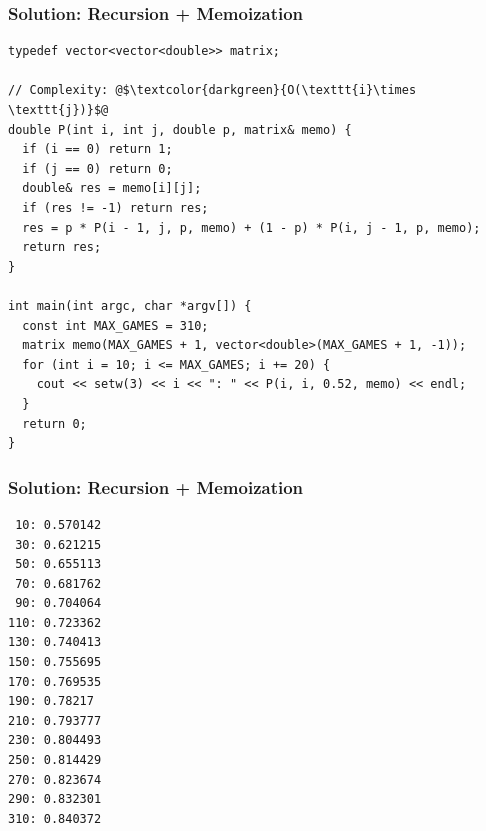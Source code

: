 \documentclass{beamer}
\begin{document}

\begin{frame}[containsverbatim]
\frametitle{Solution: Recursion + Memoization}

\scriptsize
\begin{lstlisting}
typedef vector<vector<double>> matrix;

// Complexity: @$\textcolor{darkgreen}{O(\texttt{i}\times \texttt{j})}$@
double P(int i, int j, double p, matrix& memo) {
  if (i == 0) return 1;
  if (j == 0) return 0;
  double& res = memo[i][j];
  if (res != -1) return res;
  res = p * P(i - 1, j, p, memo) + (1 - p) * P(i, j - 1, p, memo);
  return res;
}

int main(int argc, char *argv[]) {
  const int MAX_GAMES = 310;
  matrix memo(MAX_GAMES + 1, vector<double>(MAX_GAMES + 1, -1));
  for (int i = 10; i <= MAX_GAMES; i += 20) {
    cout << setw(3) << i << ": " << P(i, i, 0.52, memo) << endl;
  }
  return 0;
}
\end{lstlisting}

\end{frame}

\begin{frame}[containsverbatim]
\frametitle{Solution: Recursion + Memoization}

\scriptsize

\begin{verbatim}
 10: 0.570142
 30: 0.621215
 50: 0.655113
 70: 0.681762
 90: 0.704064
110: 0.723362
130: 0.740413
150: 0.755695
170: 0.769535
190: 0.78217
210: 0.793777
230: 0.804493
250: 0.814429
270: 0.823674
290: 0.832301
310: 0.840372
\end{verbatim}

\end{frame}
\end{document}

